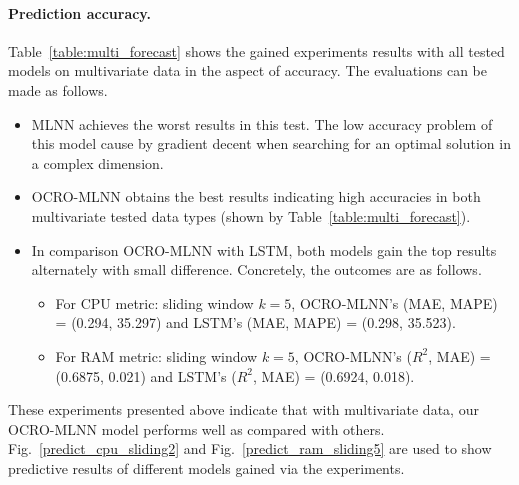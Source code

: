 \documentclass[smallcondensed, natbib]{svjour3}     %
\begin{document}
{\paragraph{\textbf{Prediction accuracy.}} Table~\ref{table:multi_forecast} shows the gained experiments results with all tested models on multivariate data in the aspect of accuracy. The evaluations can be made as follows.

\begin{itemize}
\item MLNN achieves the worst results in this test. The low accuracy problem of this model cause by gradient decent when searching for an optimal solution in a complex dimension. 
\item OCRO-MLNN obtains the best results indicating high accuracies in both multivariate tested data types (shown by Table~\ref{table:multi_forecast}).
\item In comparison OCRO-MLNN with LSTM, both models gain the top results alternately with small difference. Concretely, the outcomes are as follows. 
	\begin{itemize}
	\item For CPU metric: sliding window $k = 5$, OCRO-MLNN's (MAE, MAPE) = (0.294, 35.297) and LSTM's (MAE, MAPE) = (0.298, 35.523).
	\item For RAM metric: sliding window $k = 5$, OCRO-MLNN's ($R^2$, MAE) = (0.6875, 0.021) and LSTM's ($R^2$, MAE) = (0.6924, 0.018).
	\end{itemize}
\end{itemize}

These experiments presented above indicate that with multivariate data, our OCRO-MLNN model performs well as compared with others. Fig.~\ref{predict_cpu_sliding2} and Fig.~\ref{predict_ram_sliding5} are used to show predictive results of different models gained via the experiments.



}
\end{document}
